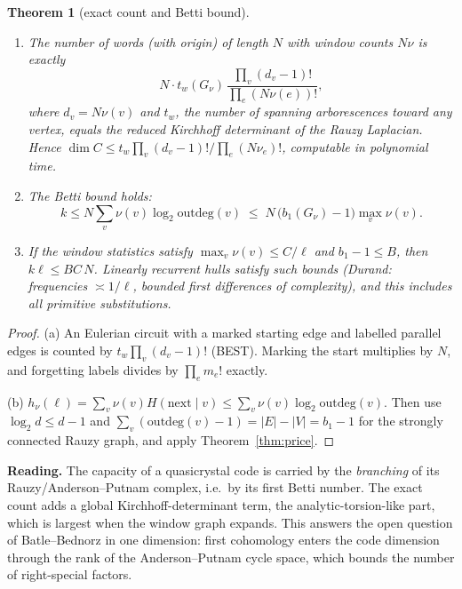 \documentclass[11pt]{article}
\newtheorem{theorem}{Theorem}[section]
\theoremstyle{definition}
\theoremstyle{remark}
\begin{document}
\begin{theorem}[exact count and Betti bound]\label{thm:betti}
\begin{enumerate}
\item[(a)] The number of words (with origin) of length $N$ with window counts $N\nu$ is exactly
\[N\cdot t_w(G_\nu)\,\frac{\prod_v(d_v-1)!}{\prod_e(N\nu(e))!},\]
where $d_v=N\nu(v)$ and $t_w$, the number of spanning arborescences toward any vertex, equals the reduced Kirchhoff determinant of the Rauzy Laplacian. Hence $\dim C\le t_w\prod_v(d_v-1)!/\prod_e(N\nu_e)!$, computable in polynomial time.
\item[(b)] The Betti bound holds:
\[k\le N\sum_v\nu(v)\log_2\mathrm{outdeg}(v)\;\le\;N\,\big(b_1(G_\nu)-1\big)\max_v\nu(v).\]
\item[(c)] If the window statistics satisfy $\max_v\nu(v)\le C/\ell$ and $b_1-1\le B$, then $k\ell\le BC\,N$. Linearly recurrent hulls satisfy such bounds (Durand: frequencies $\asymp1/\ell$, bounded first differences of complexity), and this includes all primitive substitutions.
\end{enumerate}
\end{theorem}

\begin{proof}
(a) An Eulerian circuit with a marked starting edge and labelled parallel edges is counted by $t_w\prod_v(d_v-1)!$ (BEST). Marking the start multiplies by $N$, and forgetting labels divides by $\prod_e m_e!$ exactly.

(b) $h_\nu(\ell)=\sum_v\nu(v)H(\text{next}\mid v)\le\sum_v\nu(v)\log_2\mathrm{outdeg}(v)$. Then use $\log_2d\le d-1$ and $\sum_v(\mathrm{outdeg}(v)-1)=|E|-|V|=b_1-1$ for the strongly connected Rauzy graph, and apply Theorem~\ref{thm:price}.
\end{proof}

\textbf{Reading.} The capacity of a quasicrystal code is carried by the \emph{branching} of its Rauzy/Anderson--Putnam complex, i.e.\ by its first Betti number. The exact count adds a global Kirchhoff-determinant term, the analytic-torsion-like part, which is largest when the window graph expands. This answers the open question of Batle--Bednorz in one dimension: first cohomology enters the code dimension through the rank of the Anderson--Putnam cycle space, which bounds the number of right-special factors.
\end{document}
